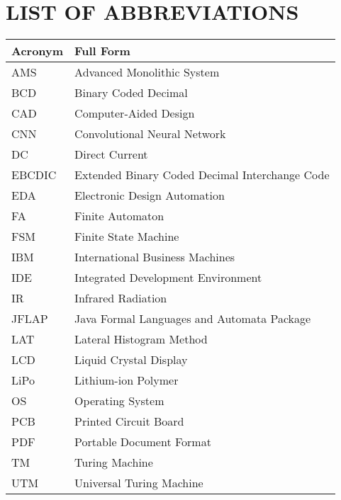 \chapter*{\centering LIST OF ABBREVIATIONS}
\begin{tabular}{ll}
    \toprule
    \textbf{Acronym} & \textbf{Full Form}                                    \\
    \midrule
    AMS              & Advanced Monolithic System                            \\
    BCD              & Binary Coded Decimal                                  \\
    CAD              & Computer-Aided Design                                 \\
    CNN              & Convolutional Neural Network                          \\
    DC               & Direct Current                                        \\
    EBCDIC           & Extended Binary Coded Decimal Interchange Code        \\
    EDA              & Electronic Design Automation                          \\
    FA               & Finite Automaton                                      \\
    FSM              & Finite State Machine                                  \\
    IBM              & International Business Machines                       \\
    IDE              & Integrated Development Environment                    \\
    IR               & Infrared Radiation                                    \\
    JFLAP            & Java Formal Languages and Automata Package            \\
    LAT              & Lateral Histogram Method                              \\
    LCD              & Liquid Crystal Display                                \\
    LiPo             & Lithium-ion Polymer                                   \\
    OS               & Operating System                                      \\
    PCB              & Printed Circuit Board                                 \\
    PDF              & Portable Document Format                              \\
    TM               & Turing Machine                                        \\
    UTM              & Universal Turing Machine                              \\
    \bottomrule
\end{tabular}

